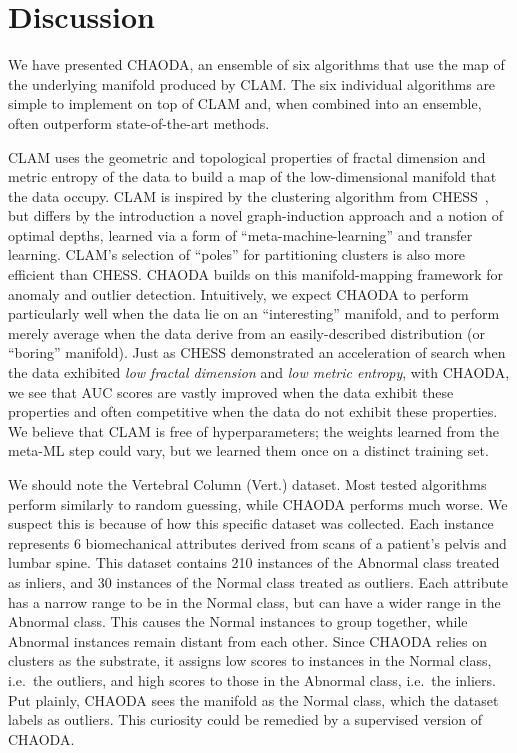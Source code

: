 \section{Discussion}
\label{sec:discussion}

We have presented CHAODA, an ensemble of six algorithms that use the map of the underlying manifold produced by CLAM\@.
The six individual algorithms are simple to implement on top of CLAM and, when combined into an ensemble, often outperform state-of-the-art methods.

CLAM uses the geometric and topological properties of fractal dimension and metric entropy of the data to build a map of the low-dimensional manifold that the data occupy.
CLAM is inspired by the clustering algorithm from CHESS~\cite{ishaq2019clustered}, but differs by the introduction a novel graph-induction approach and a notion of optimal depths, learned via a form of ``meta-machine-learning'' and transfer learning.
CLAM's selection of ``poles'' for partitioning clusters is also more efficient than CHESS.
CHAODA builds on this manifold-mapping framework for anomaly and outlier detection.
Intuitively, we expect CHAODA to perform particularly well when the data lie on an ``interesting'' manifold, and to perform merely average when the data derive from an easily-described distribution (or ``boring'' manifold).
Just as CHESS demonstrated an acceleration of search when the data exhibited \emph{low fractal dimension} and \emph{low metric entropy}, with CHAODA, we see that AUC scores are vastly improved when the data exhibit these properties and often competitive when the data do not exhibit these properties.
We believe that CLAM is free of hyperparameters; the weights learned from the meta-ML step could vary, but we learned them once on a distinct training set.

We should note the Vertebral Column (Vert.) dataset.
Most tested algorithms perform similarly to random guessing, while CHAODA performs much worse.
We suspect this is because of how this specific dataset was collected.
Each instance represents 6 biomechanical attributes derived from scans of a patient's pelvis and lumbar spine.
This dataset contains 210 instances of the Abnormal class treated as inliers, and 30 instances of the Normal class treated as outliers.
Each attribute has a narrow range to be in the Normal class, but can have a wider range in the Abnormal class.
This causes the Normal instances to group together, while Abnormal instances remain distant from each other.
Since CHAODA relies on clusters as the substrate, it assigns low scores to instances in the Normal class, i.e.\ the outliers, and high scores to those in the Abnormal class, i.e.\ the inliers.
Put plainly, CHAODA sees the manifold as the Normal class, which the dataset labels as outliers.
This curiosity could be remedied by a supervised version of CHAODA.


